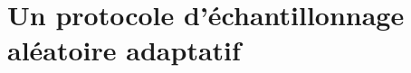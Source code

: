 
\chapter{Un protocole d'échantillonnage aléatoire adaptatif}
\label{net:chap:spray}
\minitoc



%













